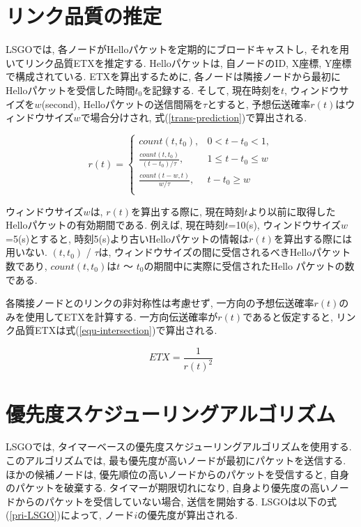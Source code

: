 \documentclass[10pt]{jreport}
\begin{document}
\section{リンク品質の推定}
\label{link-quality}
LSGOでは, 各ノードがHelloパケットを定期的にブロードキャストし, それを用いてリンク品質ETXを推定する. Helloパケットは, 自ノードのID, X座標, Y座標で構成されている. ETXを算出するために, 各ノードは隣接ノードから最初にHelloパケットを受信した時間$t_{0}$を記録する. そして, 現在時刻を$t$, ウィンドウサイズを$w$(second), Helloパケットの送信間隔を$\tau$とすると, 予想伝送確率$r(t)$はウィンドウサイズ$w$で場合分けされ, 式(\ref{trans-prediction})で算出される.

\begin{equation}
	\label{trans-prediction}
	r(t) =\begin{cases}count(t, t_{0}), & 0 < t - t_{0} < 1,  \\ \frac{count(t,t_{0})}{(t-t_{0}) / \tau}, & 1 \leq t - t_{0} \leq w\\
		\frac{count(t - w,t)}{w / \tau}, &  t - t_{0} \geq w\\
	\end{cases}
\end{equation}


ウィンドウサイズ$w$は, $r(t)$を算出する際に, 現在時刻$t$より以前に取得したHelloパケットの有効期間である. 例えば, 現在時刻$t$=10(s), ウィンドウサイズ$w$=5(s)とすると, 時刻5(s)より古いHelloパケットの情報は$r(t)$を算出する際には用いない. $(t,t_{0})$ / $\tau$は, ウィンドウサイズの間に受信されるべきHelloパケット数であり, $count(t,t_{0})$は$t$ ～ $t_{0}$の期間中に実際に受信されたHello パケットの数である. \par
各隣接ノードとのリンクの非対称性は考慮せず, 一方向の予想伝送確率$r(t)$のみを使用してETXを計算する. 一方向伝送確率が$r(t)$であると仮定すると, リンク品質ETXは式(\ref{equ-intersection})で算出される.

\begin{equation}
	\label{equ-intersection}
	ETX = \frac{1}{  {r(t)}^{2}   } 
\end{equation}

\section{優先度スケジューリングアルゴリズム}

LSGOでは, タイマーベースの優先度スケジューリングアルゴリズムを使用する. このアルゴリズムでは, 最も優先度が高いノードが最初にパケットを送信する. ほかの候補ノードは, 優先順位の高いノードからのパケットを受信すると, 自身のパケットを破棄する. タイマーが期限切れになり, 自身より優先度の高いノードからのパケットを受信していない場合, 送信を開始する. LSGOは以下の式(\ref{pri-LSGO})によって, ノード$i$の優先度が算出される.
\end{document}

